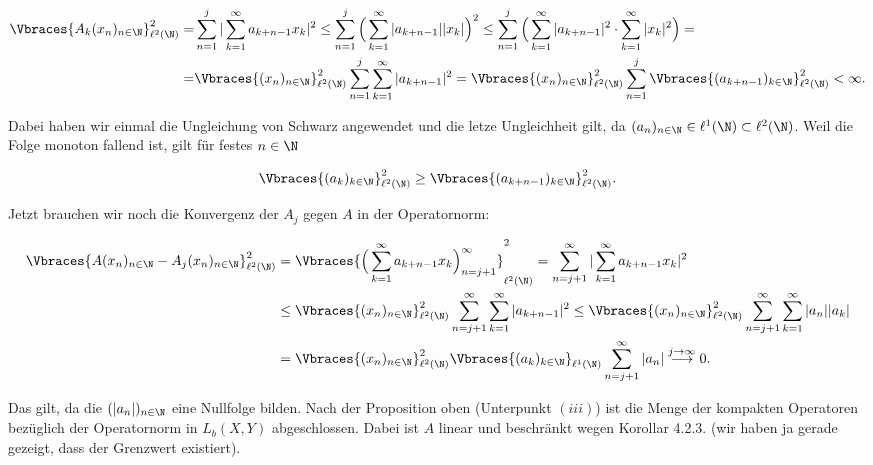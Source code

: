 \begin{solution}
\begin{align*}
  \Vbraces{A_k(x_n)_{n\in\N}}_{\ell^2(\N)}^2 =&
  \sum_{n=1}^j |\sum_{k=1}^\infty a_{k+n-1}x_k|^2  \leq
  \sum_{n=1}^j \Big( \sum_{k=1}^\infty |a_{k+n-1}| |x_k|\Big)^2 \leq
  \sum_{n=1}^j \Big( \sum_{k=1}^\infty |a_{k+n-1}|^2 \cdot \sum_{k=1}^\infty |x_k|^2\Big) = \\
  =& \Vbraces{(x_n)_{n \in \N}}_{\ell^2(\N)}^2 \sum_{n=1}^j \sum_{k=1}^\infty |a_{k+n-1}|^2 =
  \Vbraces{(x_n)_{n \in \N}}_{\ell^2(\N)}^2 \sum_{n=1}^j \Vbraces{(a_{k+n-1})_{k \in \N}}_{\ell^2(\N)}^2
  < \infty.
\end{align*}

Dabei haben wir einmal die Ungleichung von Schwarz angewendet und die letze Ungleichheit gilt, da
$(a_n)_{n\in \N} \in \ell^1(\N) \subset \ell^2(\N)$. Weil die Folge monoton fallend ist, gilt
für festes $n \in \N$

\begin{align*}
  \Vbraces{(a_k)_{k\in \N}}_{\ell^2(\N)}^2 \geq \Vbraces{(a_{k+n-1})_{k \in \N}}_{\ell^2(\N)}^2.
\end{align*}

Jetzt brauchen wir noch die Konvergenz der $A_j$ gegen $A$ in der Operatornorm:

\begin{align*}
  \Vbraces{A(x_n)_{n \in \N}- A_j(x_n)_{n \in \N}}_{\ell^2(\N)}^2 &=
  \Vbraces{\Big(\sum_{k=1}^\infty a_{k+n-1} x_k\Big)_{n=j+1}^\infty}_{\ell^2(\N)}^2
  = \sum_{n=j+1}^\infty |\sum_{k=1}^\infty a_{k+n-1} x_k|^2 \\
  &\leq \Vbraces{(x_n)_{n \in \N}}_{\ell^2(\N)}^2 \sum_{n=j+1}^\infty \sum_{k=1}^\infty |a_{k+n-1}|^2
  \leq \Vbraces{(x_n)_{n \in \N}}_{\ell^2(\N)}^2 \sum_{n=j+1}^\infty \sum_{k=1}^\infty |a_n||a_k| \\
  &= \Vbraces{(x_n)_{n \in \N}}_{\ell^2(\N)}^2 \Vbraces{(a_k)_{k \in \N}}_{\ell^1(\N)} \sum_{n=j+1}^\infty |a_n|
  \stackrel{j \rightarrow \infty}{\longrightarrow} 0.
\end{align*}

Das gilt, da die $(|a_n|)_{n \in \N}$ eine Nullfolge bilden. Nach der Proposition oben
(Unterpunkt $(iii)$) ist die Menge der kompakten Operatoren bezüglich der Operatornorm in
$L_b(X,Y)$ abgeschlossen. Dabei ist $A$ linear und beschränkt wegen Korollar 4.2.3. (wir haben
ja gerade gezeigt, dass der Grenzwert existiert).


\end{solution}

